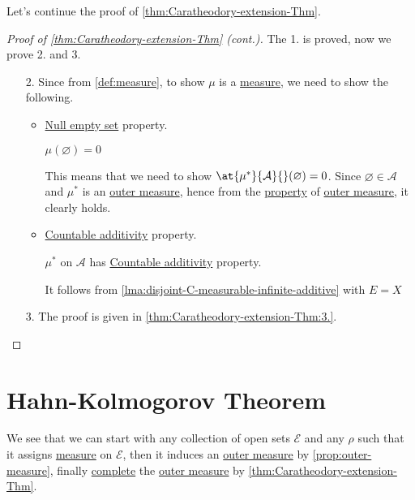 Let's continue the proof of \autoref{thm:Caratheodory-extension-Thm}.
\begin{proof}[Proof of \autoref{thm:Caratheodory-extension-Thm} (cont.)]\label{pf:Caratheodory-extension-Thm-cont}
	The 1. is proved, now we prove 2. and 3.
	\begin{enumerate}[(1)]
		\item[2.] Since from \autoref{def:measure}, to show \(\mu \) is a \hyperref[def:measure]{measure}, we need to show the following.
			\begin{itemize}
				\item \hyperref[def:measure-null-empty-set]{Null empty set} property.
				      \begin{claim}
					      \(\mu (\varnothing ) = 0\)
				      \end{claim}
				      \begin{explanation}
					      This means that we need to show \(\at{\mu^{\ast} }{\mathcal{A}}{}(\varnothing ) = 0\). Since \(\varnothing \in \mathcal{A} \) and \(\mu^{\ast}\) is
					      an \hyperref[def:outer-measure]{outer measure}, hence from the \hyperref[def:outer-measure-null-empty-set]{property} of \hyperref[def:outer-measure]{outer measure}, it clearly holds.
				      \end{explanation}
				\item \hyperref[def:measure-countable-additivity]{Countable additivity} property.
				      \begin{claim}
					      \(\mu ^{\ast} \) on \(\mathcal{A} \) has \hyperref[def:measure-countable-additivity]{Countable additivity} property.
				      \end{claim}
				      \begin{explanation}
					      It follows from \autoref{lma:disjoint-C-measurable-infinite-additive} with \(E = X\)
				      \end{explanation}
			\end{itemize}
		\item[3.] The proof is given in \autoref{thm:Caratheodory-extension-Thm:3.}.
	\end{enumerate}
\end{proof}

\section{Hahn-Kolmogorov Theorem}
We see that we can start with any collection of open sets \(\mathcal{E}\) and any \(\rho\) such that it assigns \hyperref[def:measure]{measure} on \(\mathcal{E}\), then it induces an
\hyperref[def:outer-measure]{outer measure} by \autoref{prop:outer-measure}, finally \hyperref[def:complete-measure-space]{complete} the \hyperref[def:outer-measure]{outer measure} by \autoref{thm:Caratheodory-extension-Thm}.

